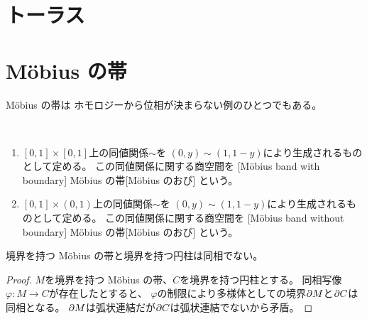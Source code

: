 \documentclass[report]{jlreq}
\begin{document}
%
\section{トーラス}

\begin{definition}
    \TODO{}
\end{definition}

%
\section{M\"{o}bius の帯}

M\"{o}bius の帯は
ホモロジーから位相が決まらない例のひとつでもある。

\begin{definition}[M\"{o}bius の帯]
    ~
    \begin{enumerate}
        \item $[0, 1] \times [0, 1]$上の同値関係$\sim$を
            $(0, y) \sim (1, 1 - y)$により生成されるものとして定める。
            この同値関係に関する商空間を
            [M\"{o}bius band with boundary]
                {M\"{o}bius の帯}[M\"{o}bius のおび]
            という。
        \item $[0, 1] \times (0, 1)$上の同値関係$\sim$を
            $(0, y) \sim (1, 1 - y)$により生成されるものとして定める。
            この同値関係に関する商空間を
            [M\"{o}bius band without boundary]
                {M\"{o}bius の帯}[M\"{o}bius のおび]
            という。
    \end{enumerate}
\end{definition}

\begin{proposition}
    境界を持つ M\"{o}bius の帯と境界を持つ円柱は同相でない。
\end{proposition}

\begin{proof}
    $M$を境界を持つ M\"{o}bius の帯、$C$を境界を持つ円柱とする。
    同相写像$\varphi \colon M \to C$が存在したとすると、
    $\varphi$の制限により多様体としての境界$\partial M$と$\partial C$は同相となる。
    $\partial M$は弧状連結だが$\partial C$は弧状連結でないから矛盾。
\end{proof}
\end{document}
